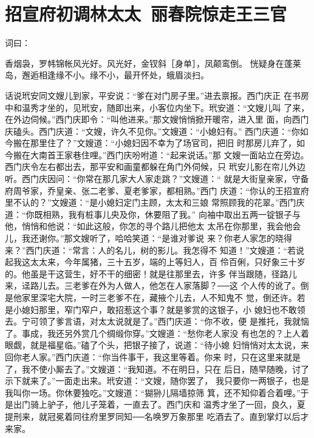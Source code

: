\chapter{招宣府初调林太太~丽春院惊走王三官}

词曰：

香烟袅，罗帏锦帐风光好。风光好，金钗斜［身单］，凤颠鸾倒。
恍疑身在蓬莱岛，邂逅相逢缘不小。缘不小，最开怀处，蛾眉淡扫。

话说玳安同文嫂儿到家，平安说：“爹在对门房子里。”进去禀报。西门庆正
在书房中和温秀才坐的，见玳安，随即出来，小客位内坐下。玳安道：“文嫂儿叫
了来，在外边伺候。”西门庆即令：“叫他进来。”那文嫂悄悄掀开暖帘，进入里
面，向西门庆磕头。西门庆道：“文嫂，许久不见你。”文嫂道：“小媳妇有。”
西门庆道：“你如今搬在那里住了？”文嫂道：“小媳妇因不幸为了场官司，把旧
时那房儿弃了，如今搬在大南首王家巷住哩。”西门庆吩咐道：“起来说话。”那
文嫂一面站立在旁边。西门庆令左右都出去，那平安和画童都躲在角门外伺候，只
玳安儿影在帘儿外边听。西门庆因问：“你常在那几家大人家走跳？”文嫂道：“
就是大街皇亲家，守备府周爷家，乔皇亲、张二老爹、夏老爹家，都相熟。”西门
庆道：“你认的王招宣府里不认的？”文嫂道：“是小媳妇定门主顾，太太和三娘
常照顾我的花翠。”西门庆道：“你既相熟，我有桩事儿央及你，休要阻了我。”
向袖中取出五两一锭银子与他，悄悄和他说：“如此这般，你怎的寻个路儿把他太
太吊在你那里，我会他会儿，我还谢你。”那文嫂听了，哈哈笑道：“是谁对爹说
来？你老人家怎的晓得来？”西门庆道：“常言：人的名儿，树的影儿。我怎得不
知道！”文嫂道：“若说起我这太太来，今年属猪，三十五岁，端的上等妇人，百
伶百俐，只好象三十岁的。他虽是干这营生，好不干的细密！就是往那里去，许多
伴当跟随，径路儿来，迳路儿去。三老爹在外为人做人，他怎在人家落脚？──这
个人传的讹了。倒是他家里深宅大院，一时三老爹不在，藏掖个儿去，人不知鬼不
觉，倒还许。若是小媳妇那里，窄门窄户，敢招惹这个事？就是爹赏的这银子，小
媳妇也不敢领去。宁可领了爹言语，对太太说就是了。”西门庆道：“你不收，便
是推托，我就恼了。事成，我还另外赏几个绸缎你穿。”文嫂道：“愁你老人家没
有也怎的？上人着眼觑，就是福星临。”磕了个头，把银子接了，说道：“待小媳
妇悄悄对太太说，来回你老人家。”西门庆道：“你当件事干，我这里等着。你来
时，只在这里来就是了，我不使小厮去了。”文嫂道：“我知道。不在明日，只在
后日，随早随晚，讨了示下就来了。”一面走出来。玳安道：“文嫂，随你罢了，
我只要你一两银子，也是我叫你一场。你休要独吃。”文嫂道：“猢狲儿隔墙掠筛
箕，还不知仰着合着哩。”于是出门骑上驴子，他儿子笼着，一直去了。西门庆和
温秀才坐了一回，良久，夏提刑来，就冠冕着同往府里罗同知──名唤罗万象那里
吃酒去了。直到掌灯以后才来家。

